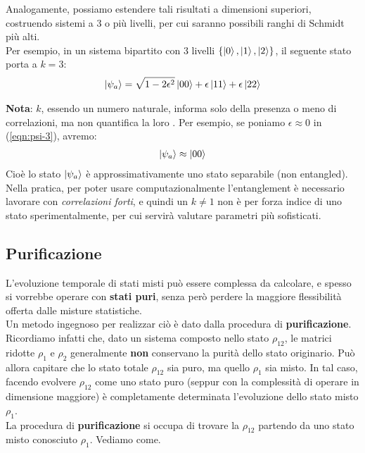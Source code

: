 \documentclass[../../InformazioneQuantistica.tex]{subfiles}
\begin{document}
Analogamente, possiamo estendere tali risultati a dimensioni superiori, costruendo sistemi a $3$ o più livelli, per cui saranno possibili ranghi di Schmidt più alti.\\
Per esempio, in un sistema bipartito con $3$ livelli $\{\Ket{0}, \Ket{1}, \Ket{2}\}$, il seguente stato porta a $k=3$:
\begin{align}
\Ket{\psi_a}= \sqrt{1-2\epsilon^2} \Ket{00} + \epsilon \Ket{11} + \epsilon\Ket{22}
\label{eqn:psi-3}
\end{align}

\textbf{Nota}: $k$, essendo un numero naturale, informa solo della presenza o meno di correlazioni, ma non quantifica la loro . Per esempio, se poniamo $\epsilon \approx 0$ in (\ref{eqn:psi-3}), avremo:
\begin{align*}
\Ket{\psi_a}\approx \Ket{00}
\end{align*}
Cioè lo stato $\Ket{\psi_a}$ è approssimativamente uno stato separabile (non entangled).\\
Nella pratica, per poter usare computazionalmente l'entanglement è necessario lavorare con \textit{correlazioni forti}, e quindi un $k\neq 1$ non è per forza indice di uno stato  sperimentalmente, per cui servirà valutare parametri più sofisticati.

\begin{comment}
\begin{table}
\centering
\begin{tabular}{| c | c | >{\centering}m{5cm} |} \toprule
\textbf{Simbolo} & & \textbf{Significato}\\ \midrule
\reddot & Modello di Bohr & Appunti in versione \textit{raw},
\end{tabular}
\end{table}
\end{comment}

\subsection{Purificazione}
L'evoluzione temporale di stati misti può essere complessa da calcolare, e spesso si vorrebbe operare con \textbf{stati puri}, senza però perdere la maggiore flessibilità offerta dalle misture statistiche.\\
Un metodo ingegnoso per realizzar ciò è dato dalla procedura di \textbf{purificazione}. Ricordiamo infatti che, dato un sistema composto nello stato $\rho_{12}$, le matrici ridotte $\rho_1$ e $\rho_2$ generalmente \textbf{non} conservano la purità dello stato originario. Può allora capitare che lo stato totale $\rho_{12}$ sia puro, ma quello  $\rho_1$ sia misto. In tal caso, facendo evolvere $\rho_{12}$ come uno stato puro (seppur con la complessità di operare in dimensione maggiore) è completamente determinata l'evoluzione dello stato misto $\rho_1$.\\
La procedura di \textbf{purificazione} si occupa di trovare la $\rho_{12}$ partendo da uno stato misto conosciuto $\rho_1$. Vediamo come.\\
\end{document}
